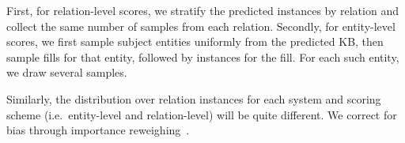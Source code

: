 First, for relation-level scores, we stratify the predicted instances by relation and collect the same number of samples from each relation.
Secondly, for entity-level scores,  we first sample subject entities uniformly from the predicted KB, then sample fills for that entity, followed by instances for the fill.
For each such entity, we draw several samples.

Similarly, the distribution over relation instances for each system and scoring scheme (i.e.\ entity-level and relation-level) will be quite different. We correct for bias through importance reweighing~\citep{}.
